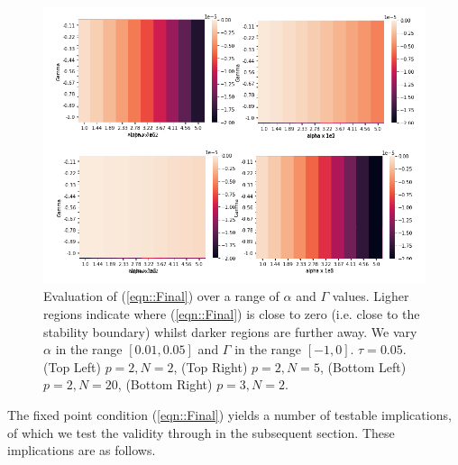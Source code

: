 \documentclass[sigconf,anonymous]{aamas}
\begin{document}
\begin{figure}[t]
    \includegraphics[width = 1.2 \linewidth, center]{Figures/Theory.png}
    \caption{Evaluation of (\ref{eqn::Final}) over a range of $\alpha$ and $\Gamma$ values. Ligher regions indicate where (\ref{eqn::Final}) is close to zero (i.e. close to the stability boundary) whilst darker regions are further away. We vary $\alpha$ in the range $[0.01, 0.05]$ and $\Gamma$ in the range $[-1, 0]$. $\tau = 0.05$. (Top Left) $p = 2, N = 2$, (Top Right) $p = 2, N = 5$, (Bottom Left) $p = 2, N = 20$, (Bottom Right) $p=3, N = 2$.}
    \label{fig:theory}
\end{figure}

The fixed point condition (\ref{eqn::Final}) yields a number of testable implications, of which we test the validity through in the subsequent section. These implications are as follows.
\end{document}
